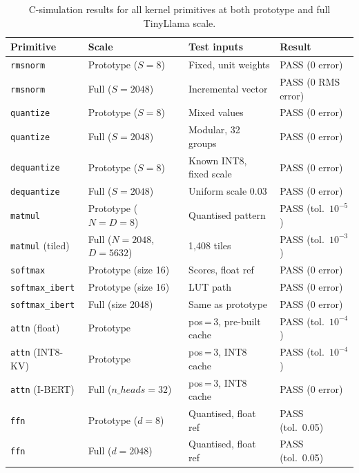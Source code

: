 \begin{table}[H]
  \centering
  \begin{tabular}{llll}
    \toprule
    Primitive & Scale & Test inputs & Result \\
    \midrule
    \texttt{rmsnorm}           & Prototype ($S = 8$)         & Fixed, unit weights     & PASS (0 error) \\
    \texttt{rmsnorm}           & Full ($S = 2048$)        & Incremental vector      & PASS (0 RMS error) \\
    \texttt{quantize}          & Prototype ($S = 8$)         & Mixed values            & PASS (0 error) \\
    \texttt{quantize}          & Full ($S = 2048$)        & Modular, 32 groups      & PASS (0 error) \\
    \texttt{dequantize}        & Prototype ($S = 8$)         & Known INT8, fixed scale & PASS (0 error) \\
    \texttt{dequantize}        & Full ($S = 2048$)        & Uniform scale 0.03      & PASS (0 error) \\
    \texttt{matmul}            & Prototype ($N = D = 8$)     & Quantised pattern       & PASS (tol.\ $10^{-5}$) \\
    \texttt{matmul} (tiled)    & Full ($N = 2048$, $D = 5632$) & 1{,}408 tiles   & PASS (tol.\ $10^{-3}$) \\
    \texttt{softmax}           & Prototype (size 16)          & Scores, float ref       & PASS (0 error) \\
    \texttt{softmax\_ibert}    & Prototype (size 16)          & LUT path                & PASS (0 error) \\
    \texttt{softmax\_ibert}    & Full (size 2048)          & Same as prototype       & PASS (0 error) \\
    \texttt{attn} (float)      & Prototype                & pos\,=\,3, pre-built cache & PASS (tol.\ $10^{-4}$) \\
    \texttt{attn} (INT8-KV)    & Prototype                & pos\,=\,3, INT8 cache   & PASS (tol.\ $10^{-4}$) \\
    \texttt{attn} (I-BERT)     & Full ($n\_heads = 32$)   & pos\,=\,3, INT8 cache   & PASS (0 error) \\
    \texttt{ffn}               & Prototype ($d = 8$)         & Quantised, float ref    & PASS (tol.\ 0.05) \\
    \texttt{ffn}               & Full ($d = 2048$)        & Quantised, float ref    & PASS (tol.\ 0.05) \\
    \bottomrule
  \end{tabular}
  \caption{C-simulation results for all kernel primitives at both prototype
           and full TinyLlama scale.}
  \label{tab:primitive_csim}
\end{table}

